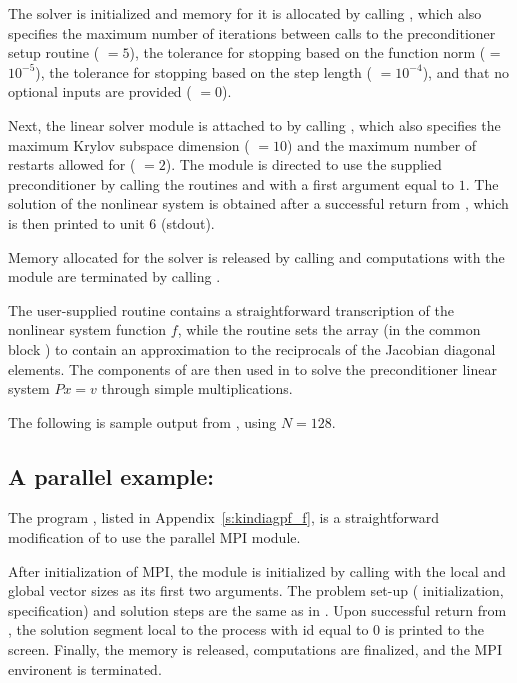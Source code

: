 The {\kinsol} solver is initialized and memory for it is allocated by
calling , which also specifies the maximum number of 
iterations between calls to the preconditioner setup routine ( $=5$),
the tolerance for stopping based on the function norm ( = $10^{-5}$),
the tolerance for stopping based on the step length ( $=10^{-4}$),
and that no optional inputs are provided ( $=0$).

Next, the {\kinspgmr} linear solver module is attached to {\kinsol} by calling
, which also specifies the maximum Krylov subspace dimension
( $=10$) and the maximum number of restarts allowed for {\spgmr}
( $=2$).  The {\kinspgmr} module is directed to use the supplied
preconditioner by  calling the routines  and
 with a first argument equal to $1$. The solution of the
nonlinear system is obtained after a successful return from , which
is then printed to unit 6 (stdout).

Memory allocated for the {\kinsol} solver is released by calling  and
computations with the {\nvecs} module are terminated by calling .

The user-supplied routine  contains a straightforward transcription
of the nonlinear system function $f$, while the routine  sets the
array  (in the common block ) to contain an approximation to 
the reciprocals of the Jacobian diagonal elements. The components of  are
then used in  to solve the preconditioner linear system $Px=v$
through simple multiplications.

The following is sample output from , using $N = 128$.



\subsection{A parallel example: }\label{ss:kindiagpf}

The program , listed in Appendix~\ref{s:kindiagpf_f}, is a
straightforward modification of  to use the parallel MPI
{\nvecp} module.

After initialization of MPI, the {\nvecp} module is initialized by calling
 with the local and global vector sizes as its first two
arguments.
The problem set-up ({\kinsol} initialization, {\kinspgmr} specification) and
solution steps are the same as in . 
Upon successful return from , the solution segment local to 
the process with id equal to $0$ is printed to the screen.
Finally, the {\kinsol} memory is released, {\nvecp} computations are 
finalized, and the MPI environent is terminated. 

